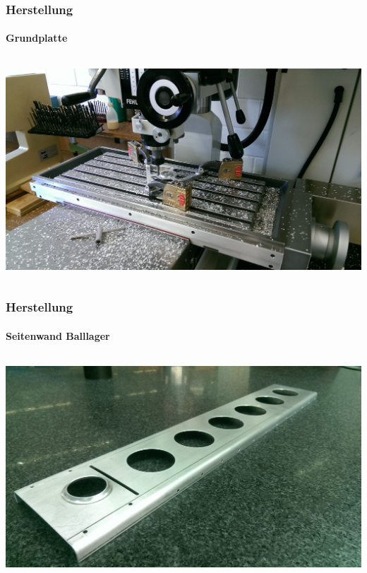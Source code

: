 \begin{frame}
    \frametitle{Herstellung}
    \framesubtitle{Grundplatte}
    \begin{columns}
        \begin{column}{0.9\textwidth}
            \centering
            \includegraphics[width=1.0\textwidth]{FotosM/Bild2.jpg}
        \end{column}
    \end{columns}
\end{frame}
\begin{frame}
    \frametitle{Herstellung}
    \framesubtitle{Seitenwand Balllager}
    \begin{columns}
        \begin{column}{0.9\textwidth}
            \centering
            \includegraphics[width=1.0\textwidth]{FotosM/Bild3.jpg}
        \end{column}
    \end{columns}
\end{frame}
